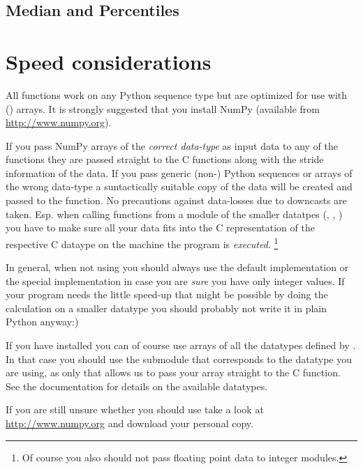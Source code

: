 \subsection{Median and Percentiles}
\label{sec:stat:median-percentiles}



\section{Speed considerations}
\label{sec:stat:speed-considerations}

All functions work on any Python sequence type but are optimized for use with
\NUMPY{} (\numpy{}) arrays. It is strongly suggested that you install NumPy
(available from \url{http://www.numpy.org}).

If you pass NumPy arrays of the \emph{correct data-type} as input data to any
of the functions they are passed straight to the C functions along with the
stride information of the data. If you pass generic (non-\numpy{}) Python
sequences or \numpy{} arrays of the wrong data-type a suntactically suitable
copy of the data will be created and passed to the function. No precautions
against data-losses due to downcasts are taken. Esp. when calling functions
from a module of the smaller datatpes (, ,
) you have to make sure all your data fits into the C
representation of the respective C dataype on the machine the program is
\emph{executed}. \footnote{Of course you also should not pass floating point
   data to integer modules.}

In general, when not using \numpy{} you should always use the default
implementation  or the special implementation
 in case you are \emph{sure} you have only
integer values. If your program needs the little speed-up that might be
possible by doing the calculation on a smaller datatype you should probably not
write it in plain Python anyway:)

If you have installed \numpy{} you can of course use arrays of all the
datatypes defined by \numpy{}. In that case you should use the submodule that
corresponds to the \numpy{} datatype you are using, as only that allows us to
pass your \numpy{} array straight to the C function. See the \numpy{}
documentation for details on the available datatypes.

\begin{seealso}
   If you are still unsure whether you should use \numpy{} take a look at
   \url{http://www.numpy.org} and download your personal copy.
\end{seealso}




